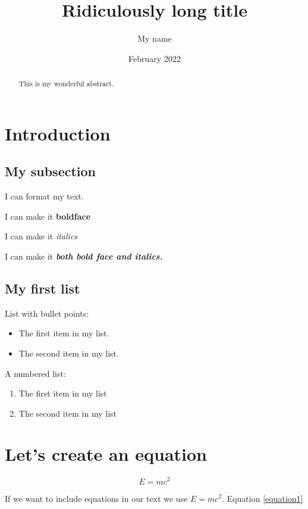 \documentclass[12pt]{article}
\title{Ridiculously long title}
\author{My name}
\date{February 2022}
\begin{document}
\maketitle

\begin{abstract}
    This is my wonderful abstract.
\end{abstract}

\section{Introduction}

\subsection{My subsection}

I can format my text.

I can make it \textbf{boldface}

I can make it \textit{italics}

I can make it \textit{\textbf{both bold face and italics.}}

\subsection{My first list}

List with bullet points:
\begin{itemize}
    \item The first item in my list.
    \item The second item in my list.
\end{itemize}

A numbered list:
\begin{enumerate}
    \item The first item in my list
    \item The second item in my list
\end{enumerate}

\section{Let's create an equation}

\begin{equation}
    E = mc^2
    \label{equation1}
\end{equation}

If we want to include equations in our text we use $E = mc^2$. Equation \ref{equation1}

\newpage
\end{document}
